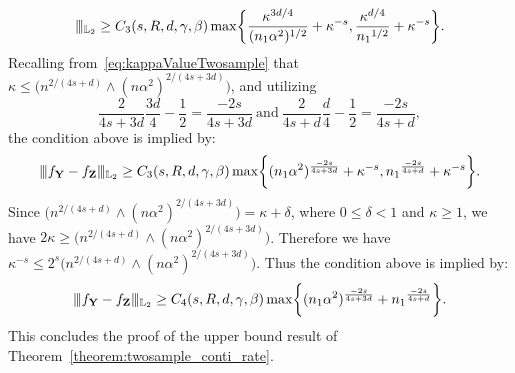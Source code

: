 \documentclass[twoside,11pt]{article}
\newcommand{\Ell}{\mathbb{L}}
\newcommand{\EllTwo}{\Ell_2} %
\newcommand{\vectorize}[1]{\mathbf{#1}}
\newcommand{\dimDensity}{d} %
\newcommand{\sampleSize}{n}
\newcommand{\smoothness}{s}
\newcommand{\ballRadius}{R}
\newcommand{\privacyParameter}{\alpha} %
\newcommand{\maxErrorTypeTwo}{\beta} %
\newcommand{\maxErrorTypeOne}{\gamma} %
\newcommand{\binNum}{\kappa}           %
\begin{document}
\begin{appendix}
\begin{itemize}
\begin{align*}
		\vert\kern-0.25ex
		\vert\kern-0.25ex
		\vert_{\EllTwo}
		\geq
		C_3 (\smoothness, \ballRadius, \dimDensity, \maxErrorTypeOne, \maxErrorTypeTwo)
		\max
		\biggl\{
		\frac
		{\binNum^{3\dimDensity/4}}
		{(\sampleSize_1 \privacyParameter^2)^{1/2}} + \binNum^{-\smoothness}
		,
		\frac
		{\binNum^{\dimDensity/4}}
		{{\sampleSize_1}^{1/2}} + \binNum^{-\smoothness}
		\biggr\}.
	\end{align*}
	Recalling from~\eqref{eq:kappaValueTwosample} that $\binNum \leq \bigl( n^{2/(4\smoothness+\dimDensity)}\wedge (n \privacyParameter^2)^{2/(4\smoothness+3\dimDensity)} \bigr)$, 
	and utilizing
	\begin{equation*}
		\frac{2}{4\smoothness+3\dimDensity}
		\frac{3\dimDensity}{4}
		- 
		\frac{1}{2}
		= 
		\frac{-2\smoothness}{4\smoothness+3\dimDensity}
		~\text{and}~
		\frac{2}{4\smoothness+\dimDensity}
		\frac{d}{4} 
		-
		\frac{1}{2}
		= 
		\frac{-2\smoothness}{4\smoothness+\dimDensity},
	\end{equation*}
	the condition above is implied by:
	\begin{equation*}
		\vert\kern-0.25ex
		\vert\kern-0.25ex
		\vert
		f_{\vectorize{Y}} - f_{\vectorize{Z}}
		\vert\kern-0.25ex
		\vert\kern-0.25ex
		\vert_{\EllTwo}
		\geq
		C_3 (\smoothness, \ballRadius, \dimDensity, \maxErrorTypeOne, \maxErrorTypeTwo)
		\max
		\biggl\{
		(\sampleSize_1 \privacyParameter^2)^{\frac{-2\smoothness}{4\smoothness+3\dimDensity}}
		+
		\binNum^{-\smoothness}
		,
		{\sampleSize_1}^{
			\frac
			{-2\smoothness}
			{4\smoothness+\dimDensity}
		}+
		\binNum^{-\smoothness}
		\biggr\}.
	\end{equation*}
	Since $\bigl( n^{2/(4\smoothness+\dimDensity)}\wedge (n \privacyParameter^2)^{2/(4\smoothness+3\dimDensity)} \bigr) = \binNum + \delta$, where $0 \leq \delta < 1$ and $\binNum \geq 1$, we have $2 \binNum \geq \bigl( n^{2/(4\smoothness+\dimDensity)}\wedge (n \privacyParameter^2)^{2/(4\smoothness+3\dimDensity)} \bigr)$.
	Therefore we have $\binNum^{-\smoothness} \leq 2^\smoothness \bigl( n^{2/(4\smoothness+\dimDensity)}\wedge (n \privacyParameter^2)^{2/(4\smoothness+3\dimDensity)} \bigr)$. Thus the condition above is implied by:
	\begin{equation*}
		\vert\kern-0.25ex
		\vert\kern-0.25ex
		\vert
		f_{\vectorize{Y}} - f_{\vectorize{Z}}
		\vert\kern-0.25ex
		\vert\kern-0.25ex
		\vert_{\EllTwo}
		\geq
		C_4 (\smoothness, \ballRadius, \dimDensity, \maxErrorTypeOne, \maxErrorTypeTwo)
		\max
		\biggl\{
		(\sampleSize_1 \privacyParameter^2)^{\frac{-2\smoothness}{4\smoothness+3\dimDensity}}
		+
		{\sampleSize_1}^{
			\frac
			{-2\smoothness}
			{4\smoothness+\dimDensity}
		}
		\biggr\}.
	\end{equation*}
	This concludes the proof of the upper bound result of Theorem~\ref{theorem:twosample_conti_rate}.
	\end{itemize}

\end{appendix}
\end{document}
